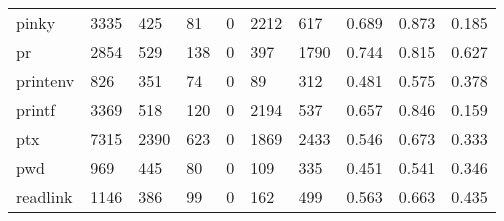 \begin{longtable}{lp{2.0cm}p{2.0cm}p{2.0cm}p{2.0cm}p{2.0cm}p{2.0cm}p{2.0cm}p{2.0cm}p{2.0cm}}
pinky     &                   3335 &                                425 &                                81 &                                0 &                              2212 &                             617 &                                   0.689 &                                  0.873 &                                0.185 \\
pr        &                   2854 &                                529 &                               138 &                                0 &                               397 &                            1790 &                                   0.744 &                                  0.815 &                                0.627 \\
printenv  &                    826 &                                351 &                                74 &                                0 &                                89 &                             312 &                                   0.481 &                                  0.575 &                                0.378 \\
printf    &                   3369 &                                518 &                               120 &                                0 &                              2194 &                             537 &                                   0.657 &                                  0.846 &                                0.159 \\
ptx       &                   7315 &                               2390 &                               623 &                                0 &                              1869 &                            2433 &                                   0.546 &                                  0.673 &                                0.333 \\
pwd       &                    969 &                                445 &                                80 &                                0 &                               109 &                             335 &                                   0.451 &                                  0.541 &                                0.346 \\
readlink  &                   1146 &                                386 &                                99 &                                0 &                               162 &                             499 &                                   0.563 &                                  0.663 &                                0.435 \\

\end{longtable}
